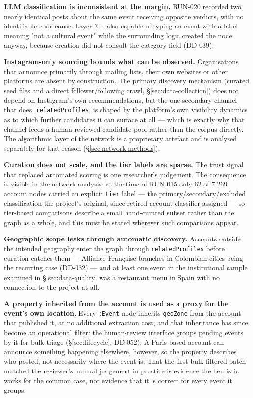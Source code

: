 \documentclass[12pt, a4paper]{report}
\begin{document}
\textbf{LLM classification is inconsistent at the margin.} RUN-020
recorded two nearly identical posts about the same event receiving
opposite verdicts, with no identifiable code cause. Layer 3 is also
capable of typing an event with a label meaning "not a cultural event"
while the surrounding logic created the node anyway, because creation did
not consult the category field (DD-039).

\textbf{Instagram-only sourcing bounds what can be observed.}
Organisations that announce primarily through mailing lists, their own
websites or other platforms are absent by construction. The primary
discovery mechanism (curated seed files and a direct follower/following
crawl, \S\ref{sec:data-collection}) does not depend on Instagram's own
recommendations, but the one secondary channel that does,
\texttt{relatedProfiles}, is shaped by the platform's own visibility
dynamics as to which further candidates it can surface at all — which is
exactly why that channel feeds a human-reviewed candidate pool rather
than the corpus directly. The algorithmic layer of the network is a
proprietary artefact and is analysed separately for that reason
(\S\ref{sec:network-methods}).

\textbf{Curation does not scale, and the tier labels are sparse.} The
trust signal that replaced automated scoring is one researcher's
judgement. The consequence is visible in the network analysis: at the
time of RUN-015 only 62 of 7{,}269 account nodes carried an explicit
\texttt{tier} label — the primary/secondary/excluded classification the
project's original, since-retired account classifier assigned — so
tier-based comparisons describe a small hand-curated subset rather than
the graph as a whole, and this must be stated wherever such comparisons
appear.

\textbf{Geographic scope leaks through automatic discovery.} Accounts
outside the intended geography enter the graph through
\texttt{relatedProfiles} before curation catches them — Alliance
Française branches in Colombian cities being the recurring case (DD-032)
— and at least one event in the institutional sample examined in
\S\ref{sec:data-quality} was a restaurant menu in Spain with no
connection to the project at all.

\textbf{A property inherited from the account is used as a proxy for the
event's own location.} Every \texttt{:Event} node inherits
\texttt{geoZone} from the account that published it, at no additional
extraction cost, and that inheritance has since become an operational
filter: the human-review interface groups pending events by it for bulk
triage (\S\ref{sec:lifecycle}, DD-052). A Paris-based account can announce
something happening elsewhere, however, so the property describes who
posted, not necessarily where the event is. That the first bulk-filtered
batch matched the reviewer's manual judgement in practice is evidence
the heuristic works for the common case, not evidence that it is correct
for every event it groups.
\end{document}
